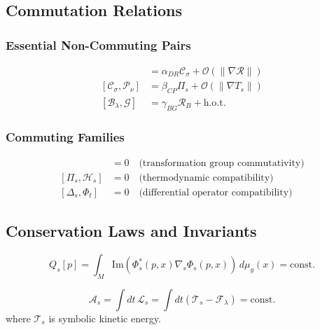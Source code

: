 \subsection{Commutation Relations}
\label{subsection:bk6_commutation_relations}

\subsubsection*{Essential Non-Commuting Pairs}
\label{subsubsection:bk6_essential_non_commuting_pairs}
\begin{align}
[D_\lambda, R_\lambda] &= \alpha_{DR} \mathcal{C}_\sigma + \mathcal{O}(\|\nabla \mathcal{R}\|)\\
[\mathcal{C}_\sigma, \mathcal{P}_\nu] &= \beta_{CP} \Pi_s + \mathcal{O}(\|\nabla T_s\|)\\
[\mathcal{B}_\lambda, \mathcal{G}] &= \gamma_{BG} \mathcal{R}_B + \text{h.o.t.}
\end{align}

\subsubsection*{Commuting Families}
\label{subsubsection:bk6_commuting_families}
\begin{align}
[T_\alpha, T_\beta] &= 0 \quad \text{(transformation group commutativity)}\\
[\Pi_s, \mathcal{H}_s] &= 0 \quad \text{(thermodynamic compatibility)}\\
[\Delta_s, \Phi_t] &= 0 \quad \text{(differential operator compatibility)}
\end{align}

\subsection{Conservation Laws and Invariants}
\label{subsection:bk6_conservation_laws_invariants}

\begin{proposition}
\label{prop:bk6_symbolic_charge_conservation}
\begin{equation}
Q_s[p] = \int_M \text{Im}(\Phi_s^*(p,x) \nabla_s \Phi_s(p,x)) \, d\mu_g(x) = \text{const.}
\end{equation}
\end{proposition}

\begin{proposition}
\label{prop:bk6_total_symbolic_action_conservation}
\begin{equation}
\mathcal{A}_s = \int dt \, \mathcal{L}_s = \int dt \left( \mathcal{T}_s - \mathcal{F}_\lambda \right) = \text{const.}
\end{equation}
where $\mathcal{T}_s$ is symbolic kinetic energy.
\end{proposition}


